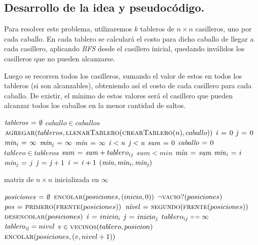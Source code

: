 \newpage
\subsection{Desarrollo de la idea y pseudocódigo.}

\vspace*{0.3cm}

Para resolver este problema, utilizaremos $k$ tableros de $n \times n$
casilleros, uno por cada caballo. En cada tablero se calculará el costo para
dicho caballo de llegar a cada casillero, aplicando \textit{BFS} desde el
casillero inicial, quedando inválidos los casilleros que no pueden
alcanzarse.

Luego se recorren todos los casilleros, sumando el valor de estos en todos
los tableros (si son alcanzables), obteniendo así el costo de cada casillero
para cada caballo. De existir, el mínimo de estos valores será el casillero
que pueden alcanzar todos los caballos en la menor cantidad de saltos.

\begin{codebox}
\li $\id{tableros} \gets \emptyset$
\li \For $caballo \in caballos$ \Do
\li   $\textnormal{\scshape agregar}(tableros,
                      \textnormal{\scshape llenarTablero}(\textnormal{\scshape crearTablero}(n),
                                           caballo))$
    \End
\li $\id{i} \gets 0$
\li $\id{j} \gets 0$
\li $\id{min_i} \gets \infty$
\li $\id{min_j} \gets \infty$
\li $\id{min} \gets \infty$
\li \While $\id{i} < \id{n}$ \Do
\li   \While $\id{j} < \id{n}$ \Do
\li     $\id{sum} \gets 0$
\li     $\id{caballo} \gets 0$
\li     \For $tablero \in tableros$ \Do
\li         $\id{sum} \gets \id{sum} + tablero_{ij}$
        \End
\li     \If $sum < min$ \Then
\li       $\id{min} \gets \id{sum}$
\li       $\id{min_i} \gets i$
\li       $\id{min_j} \gets j$
        \End
\li   $\id{j} \gets \id{j} + 1$
      \End
\li $\id{i} \gets \id{i} + 1$
    \End
\li \Return $(\id{min}, \id{min_i}, \id{min_j})$
\end{codebox}


\begin{codebox}
\li \Return matriz de $n \times n$ inicializada en $\infty$
\end{codebox}


\begin{codebox}
\li $\id{posiciones} \gets \emptyset$
\li $\textnormal{\scshape encolar}(posiciones, (inicio, 0))$
\li \While $\lnot \textnormal{\scshape vacio?}(posiciones)$ \Do
\li   $\id{pos} \gets \proc{primero}(\proc{frente}(posiciones))$
\li   $\id{nivel} \gets \proc{segundo}(\proc{frente}(posiciones))$
\li   $\textnormal{\scshape desencolar}(posiciones)$
\li   $\id{i} \gets inicio_i$
\li   $\id{j} \gets inicio_j$
\li   \If $tablero_{ij} \isequal \infty$ \Then
\li     $\id{tablero_{ij}} = nivel$
\li     \For $\id{v} \in \proc{vecinos}(tablero, posicion)$ \Do
\li       $\textnormal{\scshape encolar}(posiciones, (v, nivel + 1))$
        \End
      \End
    \End
\end{codebox}


